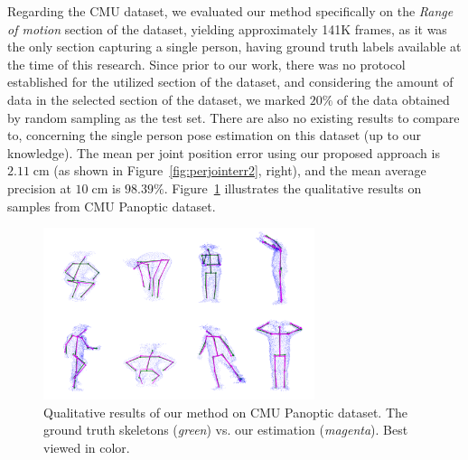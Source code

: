 \noindent
Regarding the CMU dataset, we evaluated our method specifically on the \textit{Range of motion} section of the dataset, yielding approximately 141K frames, as it was the only section capturing a single person, having ground truth labels available at the time of this research. Since prior to our work, there was no protocol established for the utilized section of the dataset, and considering the amount of data in the selected section of the dataset, we marked $20 \%$ of the data obtained by random sampling as the test set. There are also no existing results to compare to, concerning the single person pose estimation on this dataset (up to our knowledge). The mean per joint position error using our proposed approach is $2.11 \; \mbox{cm}$ (as shown in Figure~\ref{fig:perjointerr2}, right), and the mean average precision at $10 \; \mbox{cm}$ is  $98.39\%$. Figure~\ref{fig:cmu_results} illustrates the qualitative results on samples from CMU Panoptic dataset.\par
\vspace{5mm}

\begin{figure}[H]
\begin{center}
\includegraphics[height=190px]{images/results/CMU_results.png}
\caption[Qualitative results of our method on CMU Panoptic dataset.]{Qualitative results of our method on CMU Panoptic dataset. The ground truth skeletons ({\it green}) vs. our estimation ({\it magenta}). Best viewed in color.}
\label{fig:cmu_results}
\end{center}
\end{figure}

